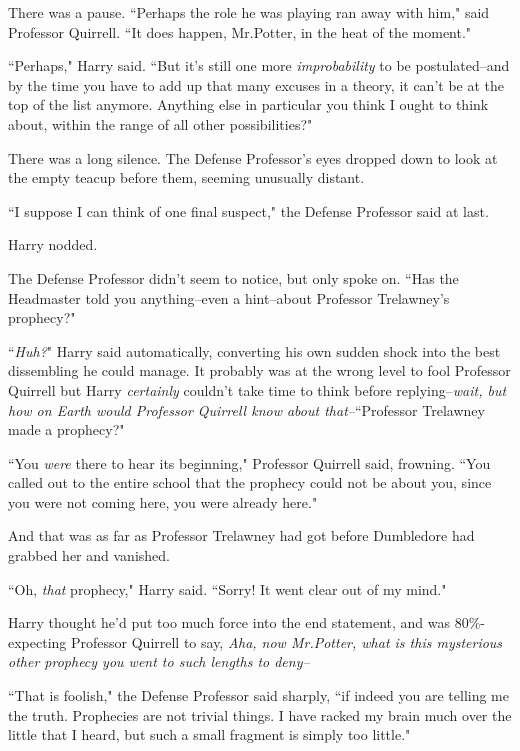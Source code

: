 There was a pause. ``Perhaps the role he was playing ran away with him," said Professor Quirrell. ``It does happen, Mr.\?Potter, in the heat of the moment."

``Perhaps," Harry said. ``But it's still one more \emph{improbability} to be postulated\---and by the time you have to add up that many excuses in a theory, it can't be at the top of the list anymore. Anything else in particular you think I ought to think about, within the range of all other possibilities?"

There was a long silence. The Defense Professor's eyes dropped down to look at the empty teacup before them, seeming unusually distant.

``I suppose I can think of one final suspect," the Defense Professor said at last.

Harry nodded.

The Defense Professor didn't seem to notice, but only spoke on. ``Has the Headmaster told you anything\---even a hint\---about Professor Trelawney's prophecy?"

``\emph{Huh?}" Harry said automatically, converting his own sudden shock into the best dissembling he could manage. It probably was at the wrong level to fool Professor Quirrell but Harry \emph{certainly} couldn't take time to think before replying\---\emph{wait, but how on Earth would Professor Quirrell know about \emph{that}\---}``Professor Trelawney made a prophecy?"

``You \emph{were} there to hear its beginning," Professor Quirrell said, frowning. ``You called out to the entire school that the prophecy could not be about you, since you were not coming here, you were already here."


And that was as far as Professor Trelawney had got before Dumbledore had grabbed her and vanished.

``Oh, \emph{that} prophecy," Harry said. ``Sorry! It went clear out of my mind."

Harry thought he'd put too much force into the end statement, and was 80\%-expecting Professor Quirrell to say, \emph{Aha, now Mr.\?Potter, what is this mysterious \emph{other} prophecy you went to such lengths to deny\---}

``That is foolish," the Defense Professor said sharply, ``if indeed you are telling me the truth. Prophecies are not trivial things. I have racked my brain much over the little that I heard, but such a small fragment is simply too little."

